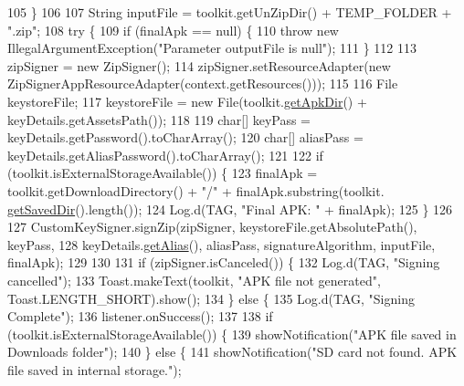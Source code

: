 \begin{DoxyCode}
105         \}
106 
107         String inputFile = toolkit.getUnZipDir() + TEMP\_FOLDER + \textcolor{stringliteral}{".zip"};
108         \textcolor{keywordflow}{try} \{
109             \textcolor{keywordflow}{if} (finalApk == null) \{
110                 \textcolor{keywordflow}{throw} \textcolor{keyword}{new} IllegalArgumentException(\textcolor{stringliteral}{"Parameter outputFile is null"});
111             \}
112 
113             zipSigner = \textcolor{keyword}{new} ZipSigner();
114             zipSigner.setResourceAdapter(\textcolor{keyword}{new} ZipSignerAppResourceAdapter(context.getResources()));
115 
116             File keystoreFile;
117             keystoreFile = \textcolor{keyword}{new} File(toolkit.\hyperlink{classorg_1_1buildmlearn_1_1toolkit_1_1ToolkitApplication_a976b0d6036419bd9382ffdca98b79fb4}{getApkDir}() + keyDetails.getAssetsPath());
118 
119             \textcolor{keywordtype}{char}[] keyPass = keyDetails.getPassword().toCharArray();
120             \textcolor{keywordtype}{char}[] aliasPass = keyDetails.getAliasPassword().toCharArray();
121 
122             \textcolor{keywordflow}{if} (toolkit.isExternalStorageAvailable()) \{
123                 finalApk = toolkit.getDownloadDirectory() + \textcolor{stringliteral}{"/"} + finalApk.substring(toolkit.
      \hyperlink{classorg_1_1buildmlearn_1_1toolkit_1_1ToolkitApplication_a5f6a7d373de5d6d2c7cfacc9e6c86f47}{getSavedDir}().length());
124                 Log.d(TAG, \textcolor{stringliteral}{"Final APK: "} + finalApk);
125             \}
126 
127             CustomKeySigner.signZip(zipSigner, keystoreFile.getAbsolutePath(), keyPass,
128                     keyDetails.\hyperlink{classorg_1_1buildmlearn_1_1toolkit_1_1model_1_1KeyStoreDetails_a27f0dbd2433e3b1044b8fceda27ab4ac}{getAlias}(), aliasPass, signatureAlgorithm, inputFile, finalApk);
129 
130 
131             \textcolor{keywordflow}{if} (zipSigner.isCanceled()) \{
132                 Log.d(TAG, \textcolor{stringliteral}{"Signing cancelled"});
133                 Toast.makeText(toolkit, \textcolor{stringliteral}{"APK file not generated"}, Toast.LENGTH\_SHORT).show();
134             \} \textcolor{keywordflow}{else} \{
135                 Log.d(TAG, \textcolor{stringliteral}{"Signing Complete"});
136                 listener.onSuccess();
137 
138                 \textcolor{keywordflow}{if} (toolkit.isExternalStorageAvailable()) \{
139                     showNotification(\textcolor{stringliteral}{"APK file saved in Downloads folder"});
140                 \} \textcolor{keywordflow}{else} \{
141                     showNotification(\textcolor{stringliteral}{"SD card not found. APK file saved in internal storage."});

\end{DoxyCode}
